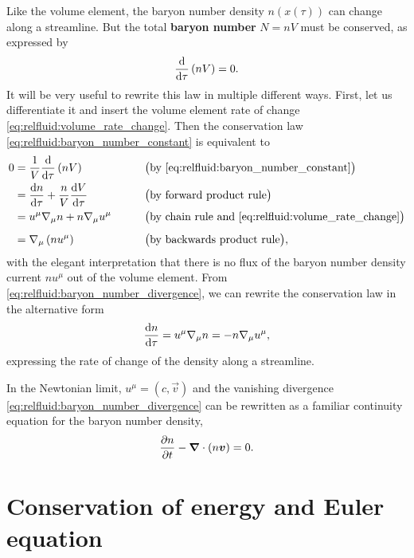 Like the volume element, the baryon number density $n(x(\tau))$ can change along a streamline.
But the total \textbf{baryon number} $N = n V$ must be conserved, as expressed by
\begin{equation}
	\odv*{\left( n V \right)}{\tau} = 0 .
\label{eq:relfluid:baryon_number_constant}
\end{equation}
It will be very useful to rewrite this law in multiple different ways.
First, let us differentiate it and insert the volume element rate of change \eqref{eq:relfluid:volume_rate_change}.
Then the conservation law \eqref{eq:relfluid:baryon_number_constant} is equivalent to
\begin{align}
	0 &= \frac{1}{V} \odv*{\left( n V \right)}{\tau} && \qquad \big( \text{by \eqref{eq:relfluid:baryon_number_constant}} \big) \nonumber \\
	  &= \odv{n}{\tau} + \frac{n}{V} \odv{V}{\tau} && \qquad \big( \text{by forward product rule} \big) \nonumber \\
	  &= u^\mu \nabla_\mu n + n \nabla_\mu u^\mu && \qquad \big( \text{by chain rule and \eqref{eq:relfluid:volume_rate_change}} \big) \nonumber \\[1.0ex]
	  &= \nabla_\mu \left( n u^\mu \right) && \qquad \big( \text{by backwards product rule} \big), \label{eq:relfluid:baryon_number_divergence}
\end{align}
with the elegant interpretation that there is no flux of the baryon number density current $n u^\mu$ out of the volume element.
From \cref{eq:relfluid:baryon_number_divergence}, we can rewrite the conservation law in the alternative form
\begin{equation}
	\odv{n}{\tau} = u^\mu \nabla_\mu n
	              = -n \nabla_\mu u^\mu ,
\label{eq:relfluid:baryon_number_rate_change}
\end{equation}
expressing the rate of change of the density along a streamline.

In the Newtonian limit, $u^\mu = (c, \vec{v})$ and the vanishing divergence \cref{eq:relfluid:baryon_number_divergence} can be rewritten as a familiar continuity equation for the baryon number density,
\begin{equation}
	\pdv{n}{t} - {\bm{\nabla}} \cdot \left( n {\bm{v}} \right) = 0.
\end{equation}

\section{Conservation of energy and Euler equation}

